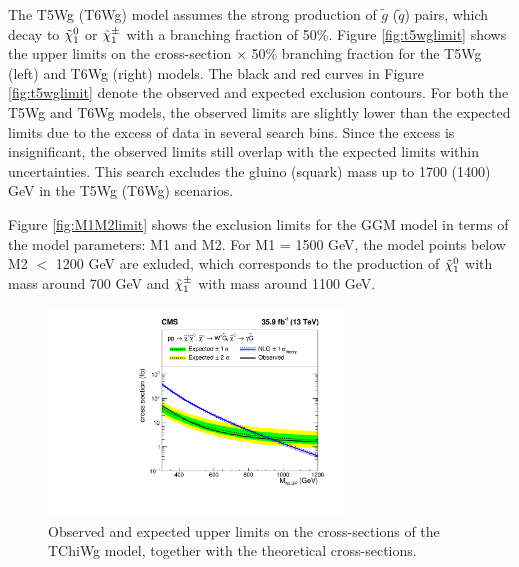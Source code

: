 \documentclass[thesis.tex]{subfiles}
\renewcommand\_{\textunderscore\allowbreak}
\begin{document}
The T5Wg (T6Wg) model assumes the strong production of $\tilde{g}$ ($\tilde{q}$) pairs, which decay to $\tilde{\chi}_1^0$ or $\tilde{\chi}_1^\pm$ with a branching fraction of 50\%. 
Figure \ref{fig:t5wglimit} shows the upper limits on the cross-section $\times$ 50\% branching fraction for the T5Wg (left) and T6Wg (right) models. 
The black and red curves in Figure \ref{fig:t5wglimit} denote the observed and expected exclusion contours. 
For both the T5Wg and T6Wg models, the observed limits are slightly lower than the expected limits due to the excess of data in several search bins.
Since the excess is insignificant, the observed limits still overlap with the expected limits within uncertainties. 
This search excludes the gluino (squark) mass up to 1700 (1400) GeV in the T5Wg (T6Wg) scenarios. 

Figure \ref{fig:M1M2limit} shows the exclusion limits for the GGM model in terms of the model parameters: M1 and M2.
For M1 = 1500 GeV, the model points below M2 $<$ 1200 GeV are exluded, which corresponds to the production of $\tilde{\chi}_1^0$ with mass around 700 GeV and $\tilde{\chi}_1^\pm$ with mass around 1100 GeV.  


\begin{figure}[tb]
  \centering
    \includegraphics[width=0.7\textwidth]{Fig/Figure_006.pdf}
		\caption{Observed and expected upper limits on the cross-sections of the TChiWg model, together with the theoretical cross-sections. }
    \label{fig:tchiwglimit}
\end{figure}
\end{document}
